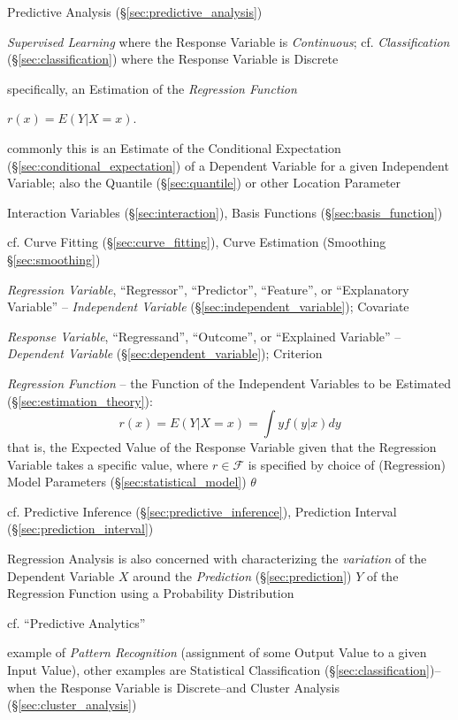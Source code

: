 \fist Predictive Analysis (\S\ref{sec:predictive_analysis})

\emph{Supervised Learning} where the Response Variable is \emph{Continuous}; cf.
\emph{Classification} (\S\ref{sec:classification}) where the Response Variable
is Discrete

specifically, an Estimation of the \emph{Regression Function}

$r(x) = E(Y | X = x)$.

commonly this is an Estimate of the Conditional Expectation
(\S\ref{sec:conditional_expectation}) of a Dependent Variable for a given
Independent Variable; also the Quantile (\S\ref{sec:quantile}) or other Location
Parameter

Interaction Variables (\S\ref{sec:interaction}), Basis Functions
(\S\ref{sec:basis_function})

\fist cf. Curve Fitting (\S\ref{sec:curve_fitting}), Curve Estimation (Smoothing
\S\ref{sec:smoothing})

\emph{Regression Variable}, ``Regressor'', ``Predictor'', ``Feature'', or
``Explanatory Variable'' -- \emph{Independent Variable}
(\S\ref{sec:independent_variable}); Covariate

\emph{Response Variable}, ``Regressand'', ``Outcome'', or ``Explained Variable''
-- \emph{Dependent Variable} (\S\ref{sec:dependent_variable}); Criterion

\emph{Regression Function} -- the Function of the Independent Variables to be
Estimated (\S\ref{sec:estimation_theory}):
\[
  r(x) = E(Y | X = x) = \int y f(y|x) dy
\]
that is, the Expected Value of the Response Variable given that the Regression
Variable takes a specific value, where $r \in \mathcal{F}$ is specified by
choice of (Regression) Model Parameters (\S\ref{sec:statistical_model}) $\theta$

\fist cf. Predictive Inference (\S\ref{sec:predictive_inference}),
Prediction Interval (\S\ref{sec:prediction_interval})

Regression Analysis is also concerned with characterizing the \emph{variation}
of the Dependent Variable $X$ around the \emph{Prediction}
(\S\ref{sec:prediction}) $Y$ of the Regression Function using a Probability
Distribution

cf. ``Predictive Analytics''

example of \emph{Pattern Recognition} (assignment of some Output Value to a
given Input Value), other examples are Statistical Classification
(\S\ref{sec:classification})--when the Response Variable is
Discrete--and Cluster Analysis (\S\ref{sec:cluster_analysis})

